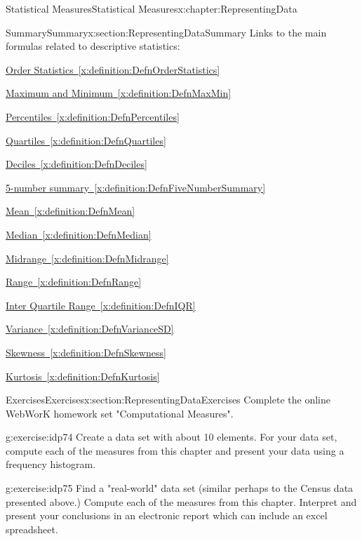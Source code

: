 \documentclass[oneside,10pt,]{book}
\newcommand{\xreffont}{\relax}
\numberwithin{equation}{section}
\begin{document}
\begin{chapterptx}{Statistical Measures}{}{Statistical Measures}{}{}{x:chapter:RepresentingData}
\begin{sectionptx}{Summary}{}{Summary}{}{}{x:section:RepresentingDataSummary}
Links to the main formulas related to descriptive statistics:%
\par
\hyperref[x:definition:DefnOrderStatistics]{Order Statistics~{\xreffont\ref{x:definition:DefnOrderStatistics}}}%
\par
\hyperref[x:definition:DefnMaxMin]{Maximum and Minimum~{\xreffont\ref{x:definition:DefnMaxMin}}}%
\par
\hyperref[x:definition:DefnPercentiles]{Percentiles~{\xreffont\ref{x:definition:DefnPercentiles}}}%
\par
\hyperref[x:definition:DefnQuartiles]{Quartiles~{\xreffont\ref{x:definition:DefnQuartiles}}}%
\par
\hyperref[x:definition:DefnDeciles]{Deciles~{\xreffont\ref{x:definition:DefnDeciles}}}%
\par
\hyperref[x:definition:DefnFiveNumberSummary]{5-number summary~{\xreffont\ref{x:definition:DefnFiveNumberSummary}}}%
\par
\hyperref[x:definition:DefnMean]{Mean~{\xreffont\ref{x:definition:DefnMean}}}%
\par
\hyperref[x:definition:DefnMedian]{Median~{\xreffont\ref{x:definition:DefnMedian}}}%
\par
\hyperref[x:definition:DefnMidrange]{Midrange~{\xreffont\ref{x:definition:DefnMidrange}}}%
\par
\hyperref[x:definition:DefnRange]{Range~{\xreffont\ref{x:definition:DefnRange}}}%
\par
\hyperref[x:definition:DefnIQR]{Inter Quartile Range~{\xreffont\ref{x:definition:DefnIQR}}}%
\par
\hyperref[x:definition:DefnVarianceSD]{Variance~{\xreffont\ref{x:definition:DefnVarianceSD}}}%
\par
\hyperref[x:definition:DefnSkewness]{Skewness~{\xreffont\ref{x:definition:DefnSkewness}}}%
\par
\hyperref[x:definition:DefnKurtosis]{Kurtosis~{\xreffont\ref{x:definition:DefnKurtosis}}}%
\end{sectionptx}
%
%
\typeout{************************************************}
\typeout{************************************************}
%
\begin{sectionptx}{Exercises}{}{Exercises}{}{}{x:section:RepresentingDataExercises}
Complete the online WebWorK homework set "Computational Measures".%
\begin{inlineexercise}{}{g:exercise:idp74}%
Create a data set with about 10 elements. For your data set, compute each of the measures from this chapter and present your data using a frequency histogram.%
\end{inlineexercise}%
\begin{inlineexercise}{}{g:exercise:idp75}%
Find a "real-world" data set (similar perhaps to the Census data presented above.) Compute each of the measures from this chapter. Interpret and present your conclusions in an electronic report which can include an excel spreadsheet.%
\end{inlineexercise}%
\end{sectionptx}
\end{chapterptx}
\end{document}
